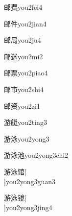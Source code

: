 \begin{verbete}[7;9]{邮费}{you2fei4}
\end{verbete}

\begin{verbete}[7;6]{邮件}{you2jian4}
\end{verbete}

\begin{verbete}[7;7]{邮局}{you2ju4}
\end{verbete}

\begin{verbete}[7;9]{邮迷}{you2mi2}
\end{verbete}

\begin{verbete}[7;11]{邮票}{you2piao4}
\end{verbete}

\begin{verbete}[7;5]{邮市}{you2shi4}
\end{verbete}

\begin{verbete}[7;10]{邮资}{you2zi1}
\end{verbete}

\begin{verbete}[12;12]{游艇}{you2ting3}
\end{verbete}

\begin{verbete}[12;8]{游泳}{you2yong3}
\end{verbete}

\begin{verbete}[12;8;6]{游泳池}{you2yong3chi2}
\end{verbete}

\begin{verbete}[12;8;11]{游泳馆}[\\]{you2yong3guan3}
\end{verbete}

\begin{verbete}[12;8;16]{游泳镜}[\\]{you2yong3jing4}
\end{verbete}


